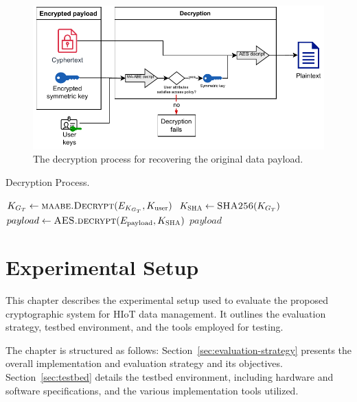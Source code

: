 \documentclass[cic,tc,english]{iiufrgs}
\numberwithin{algorithm}{chapter}
\begin{document}
        \begin{figure}[h]
            \centering
            \includegraphics[width=\textwidth]{images/diagrams/decryption_diagram.pdf}
            \caption{The decryption process for recovering the original data payload.}
            \label{fig:decryption_diagram}
        \end{figure}

        \begin{algorithm}[h]
            \caption{Decryption Process.}
            \label{alg:decryption_process}
            \begin{algorithmic}[1]
                \State $K_{G_T} \gets \textsc{maabe.Decrypt}(E_{K_{G_T}}, K_{\text{user}})$
                \State $K_{\textsc{SHA}} \gets \textsc{SHA256}(K_{G_T})$
                \State $payload \gets \textsc{AES.decrypt}(E_{\text{payload}}, K_{\textsc{SHA}})$
                \State \Return $payload$
            \EndProcedure
            \end{algorithmic}
        \end{algorithm}

    
\chapter{Experimental Setup}
\label{chap:experimentalsetup}

    This chapter describes the experimental setup used to evaluate the proposed cryptographic system for HIoT data management. It outlines the evaluation strategy, testbed environment, and the tools employed for testing.

    The chapter is structured as follows: Section~\ref{sec:evaluation-strategy} presents the overall implementation and evaluation strategy and its objectives. Section~\ref{sec:testbed} details the testbed environment, including hardware and software specifications, and the various implementation tools utilized.
\end{document}
